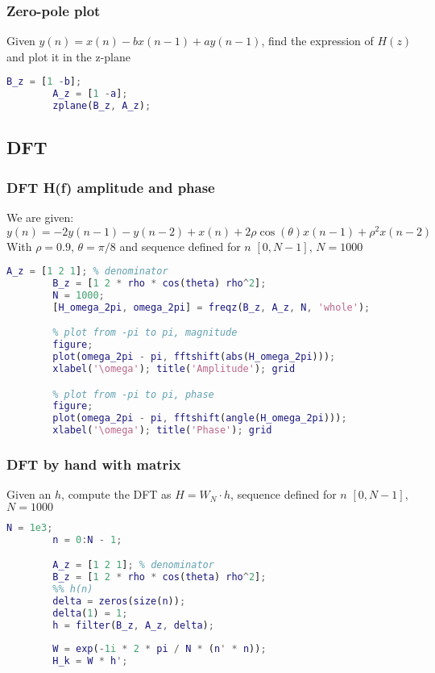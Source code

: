     \subsubsection{Zero-pole plot}
    Given $y(n)=x(n)-bx(n-1)+ay(n-1)$, find the expression of $H(z)$ and plot it in the z-plane
    \begin{lstlisting}[language=Matlab, escapeinside=`']
        B_z = [1 -b];
        A_z = [1 -a];
        zplane(B_z, A_z);
    \end{lstlisting}

\pagebreak\subsection{DFT}

    \subsubsection{DFT H(f) amplitude and phase}
    We are given:
    $$
    y(n)=-2y(n-1)-y(n-2)+x(n)+2\rho\cos(\theta)x(n-1)+\rho^2x(n-2)
    $$
    With $\rho=0.9$, $\theta=\pi/8$ and sequence defined for $n$ $[0,N-1]$, $N=1000$
    \begin{lstlisting}[language=Matlab, escapeinside=`']
        A_z = [1 2 1]; % denominator
        B_z = [1 2 * rho * cos(theta) rho^2];
        N = 1000;
        [H_omega_2pi, omega_2pi] = freqz(B_z, A_z, N, 'whole');

        % plot from -pi to pi, magnitude
        figure;
        plot(omega_2pi - pi, fftshift(abs(H_omega_2pi)));
        xlabel('\omega'); title('Amplitude'); grid

        % plot from -pi to pi, phase
        figure;
        plot(omega_2pi - pi, fftshift(angle(H_omega_2pi)));
        xlabel('\omega'); title('Phase'); grid
    \end{lstlisting}

    \subsubsection{DFT by hand with matrix}
    Given an $h$, compute the DFT as $H=W_N\cdot h$, sequence defined for $n$ $[0,N-1]$, $N=1000$
    \begin{lstlisting}[language=Matlab, escapeinside=`']
        N = 1e3;
        n = 0:N - 1;

        A_z = [1 2 1]; % denominator
        B_z = [1 2 * rho * cos(theta) rho^2];
        %% h(n)
        delta = zeros(size(n));
        delta(1) = 1;
        h = filter(B_z, A_z, delta);
        
        W = exp(-1i * 2 * pi / N * (n' * n));
        H_k = W * h';
    \end{lstlisting}

